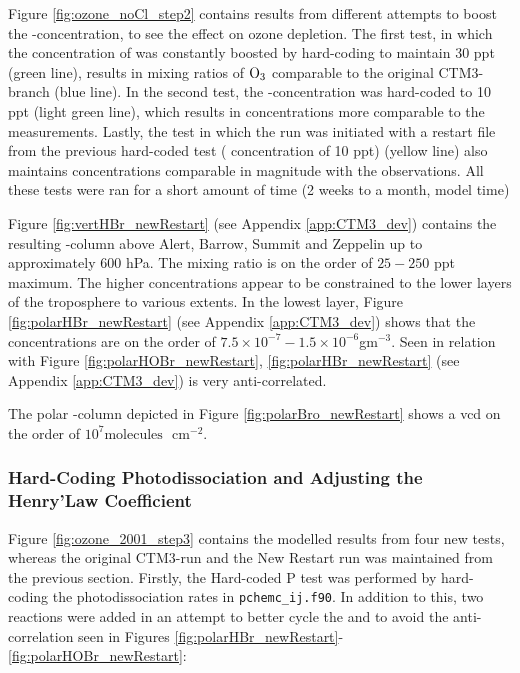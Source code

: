 \medskip

Figure \ref{fig:ozone_noCl_step2} contains results from different attempts to boost the -concentration, to see the effect on ozone depletion. The first test, in which the concentration of  was constantly boosted by hard-coding to maintain 30 ppt (green line), results in mixing ratios of $\mathrm{O_3}$ comparable to the original CTM3-branch (blue line). In the second test, the -concentration was hard-coded to 10 ppt (light green line), which results in concentrations more comparable to the measurements. Lastly, the test in which the run was initiated with a restart file from the previous hard-coded test ( concentration of 10 ppt) (yellow line) also maintains concentrations comparable in magnitude with the observations. All these tests were ran for a short amount of time (2 weeks to a month, model time)



\medskip

Figure \ref{fig:vertHBr_newRestart} (see Appendix \ref{app:CTM3_dev}) contains the resulting -column above Alert, Barrow, Summit and Zeppelin up to approximately $600$ hPa. The mixing ratio is on the order of $25 - 250$ ppt maximum. The higher concentrations appear to be constrained to the lower layers of the troposphere to various extents. In the lowest layer, Figure \ref{fig:polarHBr_newRestart} (see Appendix \ref{app:CTM3_dev}) shows that the concentrations are on the order of $7.5\times10^{-7} - 1.5\times10^{-6}$gm$^{-3}$. Seen in relation with Figure \ref{fig:polarHOBr_newRestart}, \ref{fig:polarHBr_newRestart} (see Appendix \ref{app:CTM3_dev}) is very anti-correlated. 



\medskip

The polar -column depicted in Figure \ref{fig:polarBro_newRestart} shows a \acrshort{vcd} on the order of $10^7 \text{molecules }$ cm$^{-2}$. 

\clearpage
\subsubsection{Hard-Coding Photodissociation and Adjusting the Henry'Law Coefficient}\label{sec:res_step3}

Figure \ref{fig:ozone_2001_step3} contains the modelled results from four new tests, whereas the original CTM3-run and the New Restart run was maintained from the previous section. Firstly, the Hard-coded P test was performed by hard-coding the photodissociation rates in \texttt{pchemc\_ij.f90}. In addition to this, two reactions were added in an attempt to better cycle the  and  to avoid the anti-correlation seen in Figures \ref{fig:polarHBr_newRestart}-\ref{fig:polarHOBr_newRestart}:  

